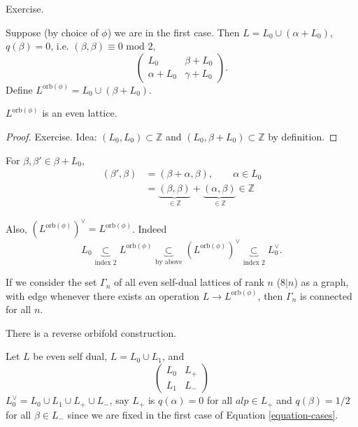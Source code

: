 \noindent
Exercise.

Suppose (by choice of $\phi$) we are in the
first case.
Then $L=L_0 \cup  (\alpha+L_0)$,
$q(\beta)=0$, i.e.
$(\beta,\beta)\equiv 0 \text{ mod }2$,
$$
\begin{pmatrix}
L_0&\beta+L_0\\
\alpha+L_0&\gamma+L_0
\end{pmatrix}.
$$
Define $L^{\text{orb}(\phi)}=L_0 \cup
(\beta+L_0)$.

\begin{lemma}
\label{lemma-even-lattice}
$L^{\text{orb}(\phi)}$ is an even lattice.
\end{lemma}

\begin{proof}
Exercise. Idea: $(L_0,L_0) \subset
\mathbb{Z}$ and
$(L_0,\beta+L_0)\subset \mathbb{Z}$ by
definition.
\end{proof}

\noindent
For $\beta,\beta' \in \beta+L_0$,
$$
\begin{aligned}
(\beta',\beta)&=(\beta+\alpha,\beta),\qquad
\alpha \in L_0\\
&=\underbrace{(\beta,\beta)}_{\in \mathbb{Z}}
+\underbrace{(\alpha,\beta)}_{\in \mathbb{Z}}
\in \mathbb{Z}
\end{aligned}
$$

\noindent
Also,
$(L^{\text{orb}(\phi)})^\vee=L^{\text{orb}
(\phi)}$.
Indeed
$$
L_0 \underbrace{\subset}_{\text{index
2}}L^{\text{orb}(\phi)}
\underbrace{\subset}_{\text{by above}}
(L^{\text{orb}(\phi)})^\vee
\underbrace{\subset}_{\text{index 2}}
L_0^\vee.
$$

\begin{theorem}[Niemer]
\label{theorem-niemer}
If we consider the set $\Gamma_n$ of all
even self-dual lattices of rank $n$ ($8|n$)
as a graph, with edge whenever there
exists an operation $L \to
L^{\text{orb}(\phi)}$,
then $\Gamma_n$ is connected for all $n$.
\end{theorem}

\begin{remark}
\label{remark-reverse-orbifold}
There is a reverse orbifold construction.
\end{remark}

\noindent
Let $L$ be even self dual, $L=L_0 \cup  L_1$,
and
$$
\begin{pmatrix}
L_0&L_+\\
L_1&L_-
\end{pmatrix}
$$
$L_0^\vee=L_0 \cup  L_1 \cup  L_+ \cup  L_-$,
say $L_+$ is $q(\alpha)=0$ for all $alp \in
L_+$
and $q(\beta)=1/2$ for all $\beta \in L_-$
since we are fixed in the first case of
Equation \ref{equation-cases}.

